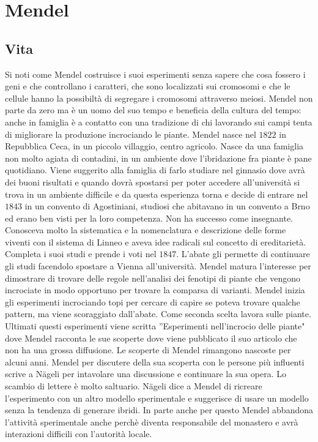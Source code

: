 \chapter{Mendel}
\section{Vita}
Si noti come Mendel costruisce i suoi esperimenti senza sapere che cosa fossero i geni e che controllano i caratteri, che sono localizzati sui cromosomi e che le cellule hanno la
possibilt\`a di segregare i cromosomi attraverso meiosi. Mendel non parte da zero ma \`e un uomo del suo tempo e beneficia della cultura del tempo: anche in famiglia \`e a contatto con
una tradizione di chi lavorando sui campi tenta di migliorare la produzione incrociando le piante. Mendel nasce nel $1822$ in Repubblica Ceca, in un piccolo villaggio, centro agricolo. 
Nasce da una famiglia non molto agiata di contadini, in un ambiente dove l'ibridazione fra piante \`e pane quotidiano. Viene suggerito alla famiglia di farlo studiare nel ginnasio dove
avr\`a dei buoni risultati e quando dovr\`a spostarsi per poter accedere all'universit\`a si trova in un ambiente difficile e da questa esperienza torna e decide di entrare nel $1843$ 
in un convento di Agostiniani, studiosi che abitavano in un convento a Brno ed erano ben visti per la loro competenza. Non ha successo come insegnante. Conosceva molto la sistematica
e la nomenclatura e descrizione delle forme viventi con il sistema di Linneo e aveva idee radicali sul concetto di ereditariet\`a. Completa i suoi studi e prende i voti nel $1847$. 
L'abate gli permette di continuare gli studi facendolo spostare a Vienna all'universit\`a. Mendel matura l'interesse per dimostrare di trovare delle regole nell'analisi dei fenotipi 
di piante che vengono incrociate in modo opportuno per trovare la comparsa di varianti. Mendel inizia gli esperimenti incrociando topi per cercare di capire se poteva trovare
qualche pattern, ma viene scoraggiato dall'abate. Come seconda scelta lavora sulle piante. Ultimati questi esperimenti viene scritta ''Esperimenti nell'incrocio delle piante" dove Mendel
racconta le sue scoperte dove viene pubblicato il suo articolo che non ha una grossa diffusione. Le scoperte di Mendel rimangono nascoste per alcuni anni. Mendel per discutere della sua 
scoperta con le persone pi\`u influenti scrive a N\"ageli per intavolare una discussione e continuare la sua opera. Lo scambio di lettere \`e molto saltuario. N\"ageli dice a Mendel di 
ricreare l'esperimento con un altro modello sperimentale e suggerisce di usare un modello senza la tendenza di generare ibridi. In parte anche per questo Mendel abbandona l'attivit\`a 
sperimentale anche perch\`e diventa responsabile del monastero e avr\`a interazioni difficili con l'autorit\`a locale.
